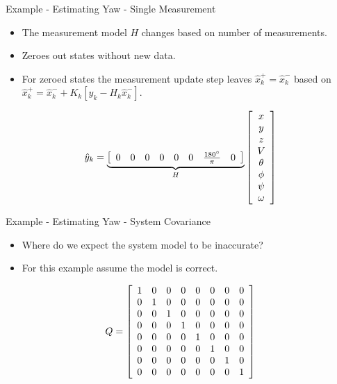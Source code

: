 \documentclass[hyperref={pdfpagelabels=false}]{beamer}
\begin{document}
\begin{frame}{Example - Estimating Yaw - Single Measurement}
\begin{itemize}
\item The measurement model $H$ changes based on number of measurements.
\item Zeroes out states without new data.
\item For zeroed states the measurement update step leaves $\hat{x}_k^+ = \hat{x}_k^-$ based on $\hat{x}_k^+ = \hat{x}_k^- + K_k\left[y_k - H_k\hat{x}_k^-\right]$.
\end{itemize}
\begin{align*}
\hat{y}_k = \underbrace{\left[\begin{array}{c c c c c c c c}
0 & 0 & 0 & 0 & 0 & 0 & \frac{180^\circ}{\pi} & 0 \\
\end{array}\right]}_{H}
\left[\begin{array}{c}
x \\ y \\ z \\ V \\ \theta \\ \phi \\ \psi \\ \omega
\end{array}\right]
\end{align*}
\end{frame}

\begin{frame}{Example - Estimating Yaw - System Covariance}
\begin{itemize}
\item Where do we expect the system model to be inaccurate?
\item For this example assume the model is correct.
\end{itemize}
\begin{align*}
Q = \left[\begin{array}{c c c c c c c c}
1 & 0 & 0 & 0 & 0 & 0 & 0 & 0 \\
0 & 1 & 0 & 0 & 0 & 0 & 0 & 0 \\
0 & 0 & 1 & 0 & 0 & 0 & 0 & 0 \\
0 & 0 & 0 & 1 & 0 & 0 & 0 & 0 \\
0 & 0 & 0 & 0 & 1 & 0 & 0 & 0 \\
0 & 0 & 0 & 0 & 0 & 1 & 0 & 0 \\
0 & 0 & 0 & 0 & 0 & 0 & 1 & 0 \\
0 & 0 & 0 & 0 & 0 & 0 & 0 & 1
\end{array}\right]
\end{align*}
\end{frame}
\end{document}
